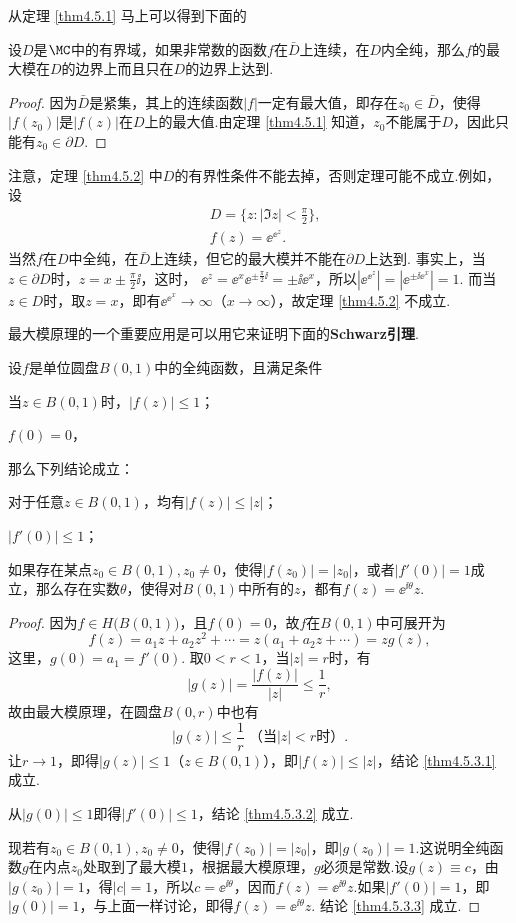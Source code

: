 从定理 \ref{thm4.5.1} 马上可以得到下面的
\begin{theorem}\label{thm4.5.2}
设$D$是$\MC$中的有界域，如果非常数的函数$f$在$\bar D$上连续，在$D$内全纯，那么$f$的最大模在$D$的边界上而且只在$D$的边界上达到.
\end{theorem}
\begin{proof}
因为$\bar D$是紧集，其上的连续函数$|f|$一定有最大值，即存在$z_0\in\bar D$，使得$|f(z_0)|$是$|f(z)|$在$D$上的最大值.由定理 \ref{thm4.5.1} 知道，$z_0$不能属于$D$，因此只能有$z_0\in\partial D$.
\end{proof}

注意，定理 \ref{thm4.5.2} 中$D$的有界性条件不能去掉，否则定理可能不成立.例如，设
\begin{align*}
&D=\bigg\{z:|\Im z|<\frac\pi2\bigg\},\\
&f(z)=\ee^{\ee^z}.
\end{align*}
当然$f$在$D$中全纯，在$\bar D$上连续，但它的最大模并不能在$\partial D$上达到. 事实上，当$z\in \partial D$时，$z=x\pm\frac\pi2\ii$，这时， $\ee^z=\ee^x\ee^ {\pm\frac\pi2\ii}=\pm\ii\ee^x$，所以$|\ee^{\ee^z}|=|\ee^{\pm\ii\ee^x}|=1$. 而当$z\in D$时，取$z=x$，即有$\ee^{\ee^x}\to\infty$（$x\to\infty$），故定理 \ref{thm4.5.2} 不成立.

最大模原理的一个重要应用是可以用它来证明下面的\textbf{Schwarz引理}.
\begin{theorem}\label{thm4.5.3}
设$f$是单位圆盘$B(0,1)$中的全纯函数，且满足条件
\begin{eenum}
  \item 当$z\in B(0,1)$时，$|f(z)|\le1$；
  \item $f(0)=0$，
\end{eenum}
那么下列结论成立：
\begin{eenum}
  \item \label{thm4.5.3.1} 对于任意$z\in B(0,1)$，均有$|f(z)|\le |z|$；
  \item \label{thm4.5.3.2} $|f'(0)|\le1$；
  \item \label{thm4.5.3.3} 如果存在某点$z_0\in B(0,1),z_0\ne0$，使得$|f(z_0)|=|z_0|$，或者$|f'(0)|=1$成立，那么存在实数$\theta$，使得对$B(0,1)$中所有的$z$，都有$f(z)=\ee^{\ii\theta}z$.
\end{eenum}
\end{theorem}
\begin{proof}
因为$f\in H\big(B(0,1)\big)$，且$f(0)=0$，故$f$在$B(0,1)$中可展开为
\[
  f(z)=a_1z+a_2z^2+\cdots=z(a_1+a_2z+\cdots)=zg(z),
\]
这里，$g(0)=a_1=f'(0)$. 取$0<r<1$，当$|z|=r$时，有
\[|g(z)|=\frac{|f(z)|}{|z|}\le\frac1r,\]
故由最大模原理，在圆盘$B(0,r)$中也有
\[|g(z)|\le\frac1r\;\mbox{（当$|z|<r$时）}.\]
让$r\to1$，即得$|g(z)|\le1$（$z\in B(0,1)$），即$|f(z)|\le|z|$，结论 \ref{thm4.5.3.1} 成立.

从$|g(0)|\le1$即得$|f'(0)|\le1$，结论 \ref{thm4.5.3.2} 成立.

现若有$z_0\in B(0,1),z_0\ne0$，使得$|f(z_0)|=|z_0|$，即$|g(z_0)|=1$.这说明全纯函数$g$在内点$z_0$处取到了最大模$1$，根据最大模原理，$g$必须是常数.设$g(z)\equiv c$，由$|g(z_0)|=1$，得$|c|=1$，所以$c=\ee^{\ii\theta}$，因而$f(z)=\ee^ {\ii\theta}z$.如果$|f'(0)|=1$，即$|g(0)|=1$，与上面一样讨论，即得$f(z)=\ee^ {\ii\theta}z$. 结论 \ref{thm4.5.3.3} 成立.
\end{proof}


